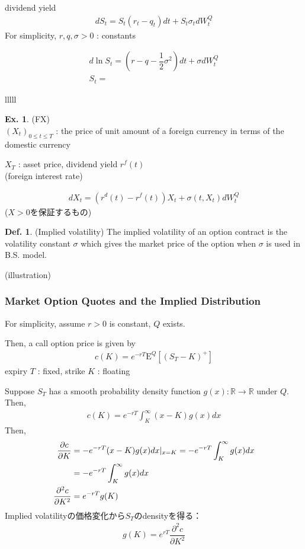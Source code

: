 \documentclass[a4paper,11pt]{jsarticle}
\theoremstyle{definition}
\newtheorem{definition}{Def.}[subsection]
\newtheorem{ex}{Ex.}[subsection]
\newcommand{\pd}[2]{\dfrac{\partial #1}{\partial #2}}
\newcommand{\pdd}[2]{\dfrac{{\partial}^2 #1} {\partial {#2}^2} }
\newcommand{\df}[2]{\dfrac{#1}{#2}}
\begin{document}
dividend yield
\begin{align}
  dS_t=S_t(r_t-q_t)dt+S_t \sigma_t dW_t^Q
\end{align}
For simplicity, $r,q,\sigma >0$ : constants

\begin{align}
  d\ln S_t = \left(r-q-\df{1}{2}\sigma^2\right)dt+\sigma dW_t^Q\\
  S_t=
\end{align}




lllll


\begin{ex}{(FX)}\\
  $(X_t)_{0\leq t\leq T}$ : the price of unit amount of
  a foreign currency in terms of the domestic currency
  
  $X_T$ : asset price, dividend yield $r^f(t)$ \\
  (foreign interest rate)

  \begin{align}
    dX_t = (r^d(t)-r^f(t))X_t + \sigma (t,X_t)dW_t^Q
  \end{align}
  ($X>0$を保証するもの)
\end{ex}

\begin{definition}{(Implied volatility)}
  The implied volatility of an option contract is the volatility
  constant $\sigma$ which gives the market price of the option
  when $\sigma$ is used in B.S. model.
\end{definition}
(illustration)




\subsubsection{Market Option Quotes and the Implied Distribution}
For simplicity, assume $r>0$ is constant, $Q$ exists.

Then, a call option price is given by
\begin{align}
  c(K)=e^{-rT}\mathrm{E}^Q[(S_T-K)^{+}]
\end{align}
expiry $T$ : fixed, strike $K$ : floating

Suppose $S_T$ has a smooth probability density function
$g(x) : \mathbb{R}\to\mathbb{R}$ under $Q$. Then,
\begin{align}
  c(K)=e^{-rT}\int_K^{\infty} (x-K)g(x)dx
\end{align}
Then,
\begin{align}
  \pd{c}{K}&=-e^{-rT}(x-K)g(x)dx|_{x=K}
  =-e^{-rT}\int_K^{\infty}g(x)dx \notag \\
  &=-e^{-rT}\int_K^{\infty}g(x)dx \\
  \pdd{c}{K}&=e^{-rT}g(K)
\end{align}
Implied volatilityの価格変化から$S_T$のdensityを得る：
\begin{align}
  g(K)=e^{rT}\pdd{c}{K}
\end{align}
\end{document}
